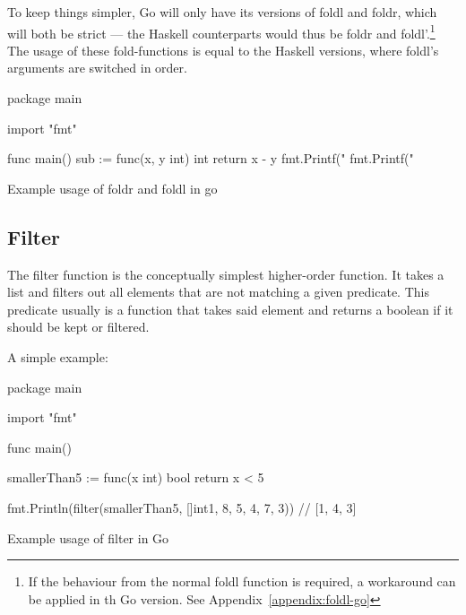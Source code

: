 To keep things simpler, Go will only have its versions of foldl and foldr, which
will both be strict --- the Haskell counterparts would thus be foldr and foldl'.\footnote{
If the behaviour from the normal foldl function is required, a workaround can
be applied in th Go version. See Appendix~\ref{appendix:foldl-go}}
The usage of these fold-functions is equal to the Haskell versions, where foldl's
arguments are switched in order.

\begin{listing}
\begin{gocode}
package main

import "fmt"

func main() {
  sub := func(x, y int) int { return x - y }
  fmt.Printf("%
  fmt.Printf("%
}
\end{gocode}
    \caption{Example usage of foldr and foldl in go}\label{code:fold-go}
\end{listing}
\subsection{Filter}

The filter function is the conceptually simplest higher-order function.
It takes a list and filters out all elements that are not matching
a given predicate.
This predicate usually is a function that takes said element and returns
a boolean if it should be kept or filtered.

A simple example:

\begin{listing}
    \begin{gocode}
package main

import "fmt"

func main() {
  smallerThan5 := func(x int) bool {
    return x < 5
  }

  fmt.Println(filter(smallerThan5, []int{1, 8, 5, 4, 7, 3})) // [1, 4, 3]
}
\end{gocode}
    \caption{Example usage of filter in Go}\label{code:filter-go}
\end{listing}
